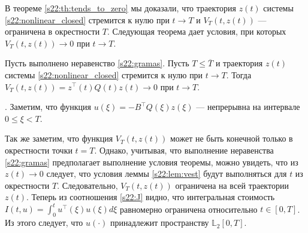 \documentclass[../main.tex]{subfiles}
\begin{document}
В теореме  \ref{s22:th:tends_to_zero} мы доказали, что траектория $z(t)$  системы \eqref{s22:nonlinear_closed} стремится к нулю при $t\to T$ и $V_{T}(t,z(t))$ --- ограничена в окрестности $T$. 
Следующая теорема дает условия, при которых $V_{T}(t,z(t))\to 0$ при $t\to T$.
\begin{theorem}
    Пусть выполнено неравенство \eqref{s22:gramas}. 
Пусть $T \leqslant \overline{T}$ и траектория  $z(t)$ системы \eqref{s22:nonlinear_closed} стремится к нулю при $t\to T$. 
Тогда  $V_{T}(t,z(t))  =z^{\top}(t)Q(t)z(t) \to 0$  при $t \to T$.
\end{theorem}
\doc. 
Заметим, что функция $ u(\xi) = -B^{\top} Q(\xi) z(\xi)$ --- непрерывна на интервале $0 \leqslant \xi <T$. 

Так же заметим, что функция $V_{T}(t,z(t))$ может не быть конечной только в окрестности точки $t = T$. 
Однако, учитывая, что выполнение неравенства \eqref{s22:gramas} предполагает выполнение условия теоремы, можно увидеть, что из $z(t)\to 0 $ следует, что условия леммы \ref{s22:lem:vest} будут выполняться для $t$ из окрестности $T$.
Следовательно, $V_{T}(t,z(t))$ ограничена на всей траектории $z(t)$. 
Теперь из соотношения \eqref{s22:J} видно, что интегральная стоимость $I(t,u) = \int_{0}^{t} u^{\top}(\xi)u(\xi) d\xi$ равномерно ограничена относительно $t \in [0,T]$. 
Из этого следует, что $u(\cdot)$ принадлежит пространству $\mathbb L_2[0,T]$. 
    
\end{document}
